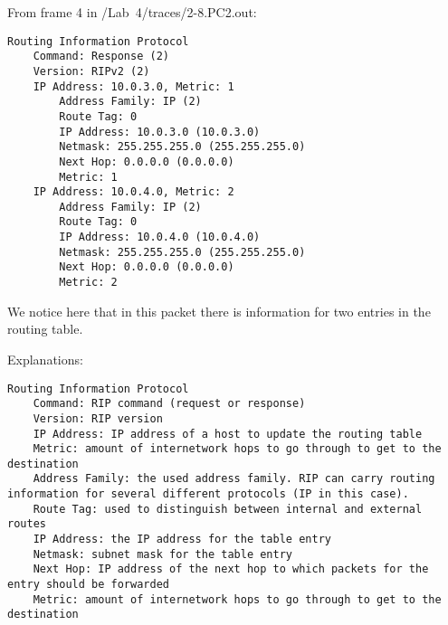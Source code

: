 From frame 4 in /Lab\ 4/traces/2-8.PC2.out: \\

\begin{lstlisting}
Routing Information Protocol
    Command: Response (2)
    Version: RIPv2 (2)
    IP Address: 10.0.3.0, Metric: 1
        Address Family: IP (2)
        Route Tag: 0
        IP Address: 10.0.3.0 (10.0.3.0)
        Netmask: 255.255.255.0 (255.255.255.0)
        Next Hop: 0.0.0.0 (0.0.0.0)
        Metric: 1
    IP Address: 10.0.4.0, Metric: 2
        Address Family: IP (2)
        Route Tag: 0
        IP Address: 10.0.4.0 (10.0.4.0)
        Netmask: 255.255.255.0 (255.255.255.0)
        Next Hop: 0.0.0.0 (0.0.0.0)
        Metric: 2
\end{lstlisting}
We notice here that in this packet there is information for two entries in the routing table.

Explanations:
\begin{lstlisting}
Routing Information Protocol
    Command: RIP command (request or response)
    Version: RIP version
    IP Address: IP address of a host to update the routing table
    Metric: amount of internetwork hops to go through to get to the destination
    Address Family: the used address family. RIP can carry routing information for several different protocols (IP in this case).
    Route Tag: used to distinguish between internal and external routes
    IP Address: the IP address for the table entry
    Netmask: subnet mask for the table entry
    Next Hop: IP address of the next hop to which packets for the entry should be forwarded
    Metric: amount of internetwork hops to go through to get to the destination
\end{lstlisting}
